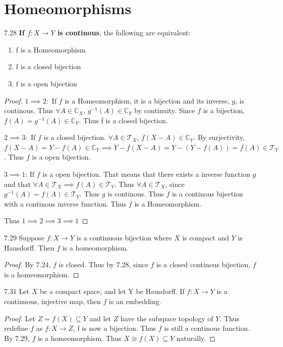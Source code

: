\documentclass{article}
\newcommand*{\T}{\mathcal{T}}
\newcommand*{\subeq}{\subseteq}
\newcommand{\C}{\mathbb{C}}
\begin{document}
\section*{Homeomorphisms}
\begin{claim}{7.28}\label{Claim 7.28.}
    \textbf{If $f: X \to Y$ is continous}, the following are equivalent:
    \begin{enumerate}
        \item f is a Homeomorphism
        \item f is a closed bijection
        \item f is a open bijection
    \end{enumerate}
\end{claim}
\begin{proof}
    $1 \implies 2:$ If $f$ is a Homeomorphism, it is a bijection and its inverse, $g$, is continous. Thus $\forall A \in \C_X$, $g^{-1}(A) \in \C_Y$ by continuity. Since $f$ is a bijection, $f(A) = g^{-1}(A) \in \C_Y$. Thus f is a closed bijection.
    
    $2 \implies 3:$ If $f$ is a closed bijection. $\forall A \in \T_X$, $f(X - A) \in \C_Y$. By surjectivity, $f(X - A) = Y - f(A) \in \C_Y \implies Y - f(X - A) = Y - (Y - f(A)) = f(A) \in \T_Y$. Thus $f$ is a open bijection. 
    
    $3 \implies 1$: If $f$ is a open bijection. That means that there exists a inverse function $g$ and that $\forall A \in \T_X \implies f(A) \in \T_Y$. Thus $\forall A \in \T_X$, since $g^{-1}(A) = f(A) \in \T_Y$. Thus $g$ is continous. Thus $f$ is a continous bijection with a continous inverse function. Thus $f$ is a Homeomorphism. 
    
    
    Thus $1 \implies 2 \implies 3 \implies 1$ 
\end{proof}

\bigskip

\begin{claim}{7.29}\label{Claim 7.29.}
    Suppose $f: X \to Y$ is a continuous bijection where $X$ is compact and $Y$ is Hausdorff. Then $f$ is a homeomorphism.
\end{claim}
\begin{proof}
    By 7.24, $f$ is closed. Thus by 7.28, since $f$ is a closed continous bijection, $f$ is a homeomorphism.     
\end{proof}

\bigskip

\begin{claim}{7.31}\label{Claim 7.31.}
    Let $X$ be a compact space, and let Y be Hausdorff. If $f: X \to Y$  is a continuous, injective map, then $f$ is an embedding.
\end{claim}
\begin{proof}
    Let $Z = f(X) \subeq Y$ and let $Z$ have the subspace topology of $Y$. Thus redefine $f$ as $f: X \to Z$, f is now a bijection. Thus $f$ is still a continous function. By 7.29, $f$ is a homeomorphism. Thus $X \cong f(X) \subeq Y$ naturally.        
\end{proof}
\end{document}
